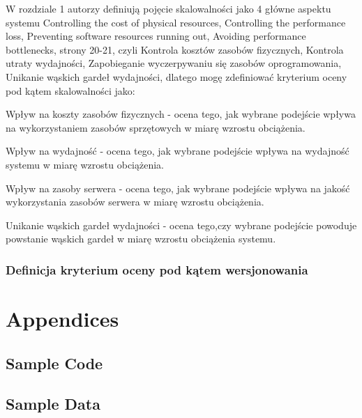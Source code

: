 \documentclass[runningheads,12pt]{llncs}
\begin{document}
W rozdziale 1 autorzy definiują pojęcie skalowalności jako 4 główne aspektu systemu Controlling the cost of physical resources, Controlling the performance loss, Preventing software resources running out, Avoiding performance bottlenecks, strony 20-21, czyli Kontrola kosztów zasobów fizycznych, Kontrola utraty wydajności, Zapobieganie wyczerpywaniu się zasobów oprogramowania, Unikanie wąskich gardeł wydajności, dlatego mogę zdefiniować kryterium oceny pod kątem skalowalności jako:

Wpływ na koszty zasobów fizycznych - ocena tego, jak wybrane podejście wpływa na  wykorzystaniem zasobów sprzętowych w miarę wzrostu obciążenia.

Wpływ na wydajność - ocena tego, jak wybrane podejście wpływa na wydajność systemu w miarę wzrostu obciążenia.

Wpływ na zasoby serwera - ocena tego, jak wybrane podejście wpływa na jakość wykorzystania zasobów serwera w miarę wzrostu obciążenia.

Unikanie wąskich gardeł wydajności - ocena tego,czy wybrane podejście powoduje powstanie wąskich gardeł  w miarę wzrostu obciążenia systemu.

\subsubsection{Definicja kryterium oceny pod kątem wersjonowania}



\nocite{*}

\listoffigures
\listoftables




\section{Appendices}

\subsection{Sample Code}
\subsection{Sample Data}
\end{document}
